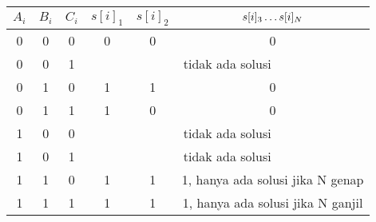 \documentclass[../main_editorial.tex]{subfiles} %
\begin{document}
\begin{table}[H]
\centering
\begin{tabular}{|c|c|c|c|c|c|}
\hline
$ A_i $ & $ B_i $ & $ C_i $ & $ s[i]_1 $ & $ s[i]_2 $ & $ s[i]_3 \mathellipsis s[i]_N $       \\ \hline
0    & 0    & 0    & 0           & 0           & 0                                 \\ \hline
0    & 0    & 1    & \multicolumn{3}{c|}{tidak ada solusi}                          \\ \hline
0    & 1    & 0    & 1           & 1           & 0                                 \\ \hline
0    & 1    & 1    & 1           & 0           & 0                                 \\ \hline
1    & 0    & 0    & \multicolumn{3}{c|}{tidak ada solusi}                          \\ \hline
1    & 0    & 1    & \multicolumn{3}{c|}{tidak ada solusi}                          \\ \hline
1    & 1    & 0    & 1           & 1           & 1, hanya ada solusi jika N genap  \\ \hline
1    & 1    & 1    & 1           & 1           & 1, hanya ada solusi jika N ganjil \\ \hline
\end{tabular}
\end{table}
\end{document}
